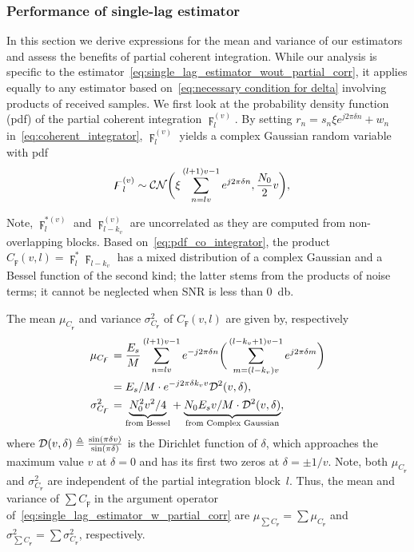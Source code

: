 \subsubsection{Performance of single-lag estimator}

In this section we derive expressions for the mean and variance of our
estimators and assess the benefits of partial coherent integration.
While our analysis is specific to the
estimator~\eqref{eq:single_lag_estimator_wout_partial_corr}, it
applies equally to any estimator based on~\eqref{eq:necessary
  condition for delta} involving products of received samples.
We first look at
the probability density function (pdf) of the partial coherent integration
$\digamma_l^{(v)}$.
By setting $r_n=s_n\xi e^{j2\pi \delta n}+w_n$ in~\eqref{eq:coherent_integrator},
$\digamma_{l}^{(v)}$ yields a complex Gaussian random variable with pdf
\begin{equation}
  \label{eq:pdf_co_integrator}
  \begin{aligned}
    &\digamma_l^{(v)} \sim \mathcal{CN}\bigg(\xi\sum_{n=lv}^{(l+1)v-1}e^{j2\pi \delta n},\frac{N_0}{2}v\bigg),
  \end{aligned}
\end{equation}

Note, $\digamma_l^{*(v)}$ and $\digamma_{l-k_v}^{(v)}$ are
uncorrelated as they are computed from non-overlapping blocks. 
Based on~\eqref{eq:pdf_co_integrator}, 
the product $C_{\digamma}(v,l)=\digamma_l^*\digamma_{l-k_v}$
has a mixed distribution of a complex Gaussian and a Bessel function
of the second kind; 
the latter stems from the products of noise terms; it cannot be
neglected when SNR is less than \SI{0}{\decibel}. 

The mean $\mu_{C_{\digamma}}$ and variance $\sigma^2_{C_{\digamma}}$ of $C_{\digamma}(v,l)$ are given by, respectively 
\begin{equation}
  \begin{aligned}
  \label{eq:mean_var_product_coherent_int}
  \mu_{C_{\digamma}}&=\frac{E_s}{M}\sum_{n=lv}^{(l+1)v-1}e^{-j2\pi \delta n}\bigg(\sum_{m=(l-k_v)v}^{(l-k_v+1)v-1}e^{j2\pi \delta m}\bigg) \\
  &=E_s/M\cdot e^{-j2\pi \delta k_vv}\mathcal{D}^2(v,\delta), \\
  \sigma^2_{C_{\digamma}}&={\underbrace{N_0^2v^2/4}_{\text{from Bessel}}}+{\underbrace{N_0E_sv/M\cdot\mathcal{D}^2(v,\delta)}_{\text{from Complex Gaussian}}},
  \end{aligned}
\end{equation}
where $\mathcal{D}(v,\delta) \triangleq \frac{\sin(\pi \delta v)}{\sin(\pi
  \delta)}$ is the Dirichlet function of $\delta$, which approaches 
the maximum value $v$ at $\delta=0$ and has its first two zeros at $\delta=\pm 1/v$.
Note, both $\mu_{C_{\digamma}}$ and $\sigma^2_{C_{\digamma}}$ are independent of the partial integration block~$l$.
Thus, the mean and variance of  
$\sum C_{\digamma}$ in the argument operator of~\eqref{eq:single_lag_estimator_w_partial_corr} 
are $\mu_{\sum C_{\digamma}}=\sum\mu_{C_{\digamma}}$ and 
$\sigma^2_{\sum C_{\digamma}}=\sum\sigma^2_{C_{\digamma}}$, respectively.


